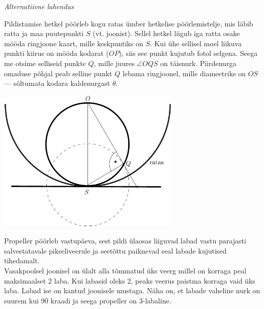 \documentclass[10pt, twoside]{article}
\begin{document}
{\vspace{0.5\baselineskip}

\textit{Alternatiivne lahendus}

Pildistamise hetkel pöörleb kogu ratas ümber hetkelise pöörlemistelje, mis läbib
ratta ja maa puutepunkti $S$ (vt. joonist). Sellel hetkel liigub iga ratta osake
mööda ringjoone kaart, mille keskpuntiks on $S$. Kui ühe sellisel moel liikuva
punkti kiirus on mööda kodarat ($OP$), siis see punkt kujutub fotol selgena.
Seega me otsime selliseid punkte $Q$, mille juures $\angle OQS$ on täisnurk.
Piirdenurga omaduse põhjal peab selline punkt $Q$ lebama ringjoonel, mille
diameetriks on $OS$ --- sõltumata kodara kaldenurgast $\theta$.
\begin{center}
	\includegraphics[width=0.65\textwidth]{2011-lahg-10-kodar_b}
\end{center}
\probend
\bigskip


\solu
\osa Propeller pöörleb vastupäeva, sest pildi ülaosas liiguvad labad vastu parajasti salvestatavale pikseliveerule ja seetõttu paiknevad seal labade kujutised tihedamalt.\\
\osa Vasakpoolsel joonisel on ülalt alla tõmmatud üks veerg millel on korraga peal maksimaalset 2 laba. Kui labasid oleks 2, peaks veerus paistma korraga vaid üks laba. Labad ise on kantud joonisele mustaga. Näha on, et labade vaheline nurk on suurem kui 90 kraadi ja seega propeller on 3-labaline.

}
\end{document}
